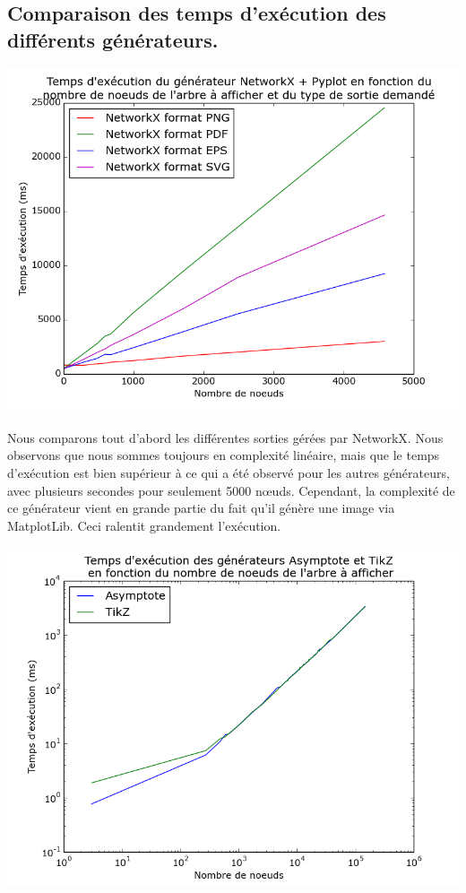 	\subsection{Comparaison des temps d'exécution des différents générateurs.}

\begin{center}

\includegraphics[width=0.80\columnwidth]{execTimeNX}

\end{center}

\paragraph{} Nous comparons tout d'abord les différentes sorties gérées par NetworkX. Nous observons que nous sommes toujours en complexité linéaire, mais que le temps d'exécution est bien supérieur à ce qui a été observé pour les autres générateurs, avec plusieurs secondes pour seulement 5000 n\oe uds. Cependant, la complexité de ce générateur vient en grande partie du fait qu'il génère une image via MatplotLib. Ceci ralentit grandement l'exécution.
	
\begin{center}

\includegraphics[width=0.80\columnwidth]{execTimeGenerators}

\end{center}

